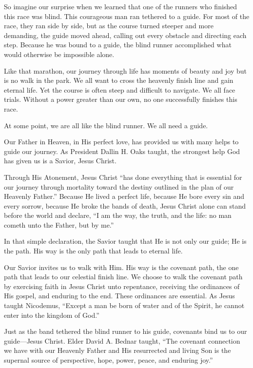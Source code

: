\documentclass[letterpaper, 11pt]{report}
\begin{document}
So imagine our surprise when we learned that one of the runners who finished this race was blind. This courageous man ran tethered to a guide. For most of the race, they ran side by side, but as the course turned steeper and more demanding, the guide moved ahead, calling out every obstacle and directing each step. Because he was bound to a guide, the blind runner accomplished what would otherwise be impossible alone.

Like that marathon, our journey through life has moments of beauty and joy but is no walk in the park. We all want to cross the heavenly finish line and gain eternal life. Yet the course is often steep and difficult to navigate. We all face trials. Without a power greater than our own, no one successfully finishes this race.

At some point, we are all like the blind runner. We all need a guide.

Our Father in Heaven, in His perfect love, has provided us with many helps to guide our journey. As President Dallin H. Oaks taught, the strongest help God has given us is a Savior, Jesus Christ.

Through His Atonement, Jesus Christ “has done everything that is essential for our journey through mortality toward the destiny outlined in the plan of our Heavenly Father.” Because He lived a perfect life, because He bore every sin and every sorrow, because He broke the bands of death, Jesus Christ alone can stand before the world and declare, “I am the way, the truth, and the life: no man cometh unto the Father, but by me.”

In that simple declaration, the Savior taught that He is not only our guide; He is the path. His way is the only path that leads to eternal life.

Our Savior invites us to walk with Him. His way is the covenant path, the one path that leads to our celestial finish line. We choose to walk the covenant path by exercising faith in Jesus Christ unto repentance, receiving the ordinances of His gospel, and enduring to the end. These ordinances are essential. As Jesus taught Nicodemus, “Except a man be born of water and of the Spirit, he cannot enter into the kingdom of God.”

Just as the band tethered the blind runner to his guide, covenants bind us to our guide—Jesus Christ. Elder David A. Bednar taught, “The covenant connection we have with our Heavenly Father and His resurrected and living Son is the supernal source of perspective, hope, power, peace, and enduring joy.”
\end{document}
